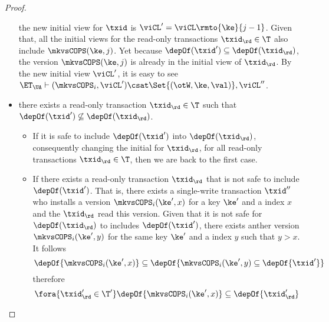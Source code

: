 \begin{proof}
\begin{itemize}
            \ie the new initial view for \( \txid \) is \( \viCL' = \viCL\rmto{\ke}{j-1} \).
            Given that, all the initial views for the read-only transactions \( \txid_\rd \in \T \) also include \( \mkvsCOPS(\ke,j) \).
            Yet because \( \depOf(\txid') \subseteq \depOf(\txid_\rd) \), the version \(\mkvsCOPS(\ke,j)  \) is already in the initial view of \( \txid_\rd \).
            By the new initial view \( \viCL' \), it is easy to see 
            \( \ET_\UA \vdash (\mkvsCOPS_i, \viCL') \csat \Set{(\otW, \ke, \val)}, \viCL'' \).
        \item there exists a read-only transaction \( \txid_\rd \in \T \) such that 
              \( \depOf(\txid') \not\subseteq \depOf(\txid_\rd) \).
              \begin{itemize}
                  \item If it is safe to include \( \depOf(\txid') \) into \( \depOf(\txid_\rd) \), consequently changing the initial for \( \txid_\rd \), for all read-only transactions \( \txid_\rd \in \T \), then we are back to the first case.
                  \item If there exists a read-only transaction \( \txid_\rd \) that is not safe to include \( \depOf(\txid') \).
                      That is, there exists a single-write transaction  \( \txid'' \) who installs a version \( \mkvsCOPS_i(\ke',x)\) for a key \( \ke' \) and a index \( x \) and the \( \txid_\rd \) read this version.
                      Given that it is not safe for  \( \depOf(\txid_\rd) \) to includes \( \depOf(\txid') \), 
                      there exists anther version \( \mkvsCOPS_i(\ke',y) \) for the same key \( \ke' \) and a index \( y \) such that \( y > x \).
                      It follows 
                      \[ 
                        \depOf{\mkvsCOPS_i(\ke',x)} \subseteq \depOf{\mkvsCOPS_i(\ke',y) \subseteq \depOf{\txid'} } 
                      \]
                      therefore 
                      \[
                          \fora{\txid'_\rd \in \T'} \depOf{\mkvsCOPS_i(\ke',x)} \subseteq \depOf{ \txid'_\rd}
                      \]
            \end{itemize}
    \end{itemize}
\end{proof}



